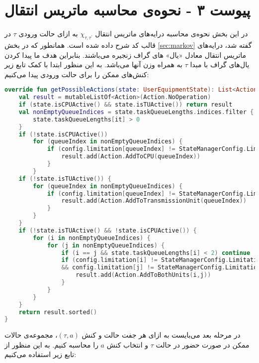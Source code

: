 \chapter*{پیوست ۳ - نحوه‌ی محاسبه ماتریس انتقال}
\label{appendix:3}
در این بخش نحوه‌ی محاسبه درایه‌های ماتریس انتقال $\chi_{\tau, \tau^{\prime}}$ به ازای حالت ورودی $\tau$ در قالب کد شرح داده شده است. همانطور که در بخش \ref{sec:markov} گفته شد، درايه‌های ماتریس انتقال معادل «یال» های گراف زنجیره می‌باشند. بنابراین هدف ما پیدا کردن یال‌های گراف با مبدا $\tau$ به همراه وزن آنها می‌باشد. به این منظور ابتدا با کمک تابع زیر کنش‌های ممکن را برای حالت ورودی پیدا می‌کنیم:
\begin{latin}
	\begin{lstlisting}[language=Kotlin, title=\rl{تابع محاسبه‌ی کنش‌های ممکن به ازای حالت داده شده}]
override fun getPossibleActions(state: UserEquipmentState): List<Action> {
	val result = mutableListOf<Action>(Action.NoOperation)
	if (state.isCPUActive() && state.isTUActive()) return result
	val nonEmptyQueueIndices = state.taskQueueLengths.indices.filter { 
		state.taskQueueLengths[it] > 0 
	}
	if (!state.isCPUActive())
		for (queueIndex in nonEmptyQueueIndices) {
			if (config.limitation[queueIndex] != StateManagerConfig.Limitation.OffloadOnly) {
				result.add(Action.AddToCPU(queueIndex))
			}
		}
	if (!state.isTUActive()) {
		for (queueIndex in nonEmptyQueueIndices) {
			if (config.limitation[queueIndex] != StateManagerConfig.Limitation.LocalOnly) {
				result.add(Action.AddToTransmissionUnit(queueIndex))
			}
		}
	}
	if (!state.isTUActive() && !state.isCPUActive()) {
		for (i in nonEmptyQueueIndices) {
			for (j in nonEmptyQueueIndices) {
				if (i == j && state.taskQueueLengths[i] < 2) continue
				if (config.limitation[i] != StateManagerConfig.Limitation.OffloadOnly 
				&& config.limitation[j] != StateManagerConfig.Limitation.LocalOnly) {
					result.add(Action.AddToBothUnits(i,j))
				}
			}
		}
	}
	return result.sorted()
}
	\end{lstlisting}
\end{latin}
\newpage
در مرحله بعد می‌بایست به ازای هر جفت حالت و کنش $(\tau, a)$، مجموعه‌ی حالات ممکن در صورت حضور در حالت $\tau$ و انتخاب کنش $a$ را محاسبه کنیم. به این منظور از تابع زیر استفاده می‌کنیم:
